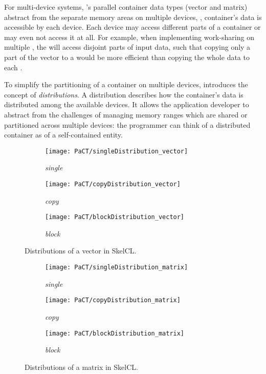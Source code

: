 For multi-device systems, \SkelCL's parallel container data types (vector and matrix) abstract from the separate memory areas on multiple \OpenCL devices, \ie, container's data is accessible by each device.
Each device may access different parts of a container or may even not access it at all.
For example, when implementing work-sharing on multiple \GPUs, the \GPUs will access disjoint parts of input data, such that copying only a part of the vector to a \GPU would be more efficient than copying the whole data to each \GPU.

To simplify the partitioning of a container on multiple devices, \SkelCL introduces the concept of \emph{distributions}.
A distribution describes how the container's data is distributed among the available devices.
It allows the application developer to abstract from the challenges of managing memory ranges which are shared or partitioned across multiple devices: the programmer can think of a distributed container as of a self-contained entity.



\begin{figure}[tb]
  \centering
  \begin{subfigure}{.3\textwidth}
    \texttt{[image: PaCT/singleDistribution\_vector]}
    \caption{\emph{single}}
    \label{fig:distributions:single}
  \end{subfigure}
  \hfill
  \begin{subfigure}{.3\textwidth}
    \texttt{[image: PaCT/copyDistribution\_vector]}
    \caption{\emph{copy}}
    \label{fig:distributions:copy}
  \end{subfigure}
  \hfill
  \begin{subfigure}{.3\textwidth}
    \texttt{[image: PaCT/blockDistribution\_vector]}
    \caption{\emph{block}}
    \label{fig:distributions:block}
  \end{subfigure}
  \caption{Distributions of a vector in SkelCL.}
  \label{fig:distributions}
  \bigskip
\end{figure}

\begin{figure}[tbp]
  \centering
  \begin{subfigure}{.22\textwidth}
    \texttt{[image: PaCT/singleDistribution\_matrix]}
    \caption{\emph{single}}
    \label{fig:distributions_matrix:single}
  \end{subfigure}
  \hfill
  \begin{subfigure}{.22\textwidth}
    \texttt{[image: PaCT/copyDistribution\_matrix]}
    \caption{\emph{copy}}
    \label{fig:distributions_matrix:copy}
  \end{subfigure}
  \hfill
  \begin{subfigure}{.22\textwidth}
    \texttt{[image: PaCT/blockDistribution\_matrix]}
    \caption{\emph{block}}
    \label{fig:distributions_matrix:block}
  \end{subfigure}
  \caption{Distributions of a matrix in SkelCL.}
  \label{fig:distributions_matrix}
\end{figure}


